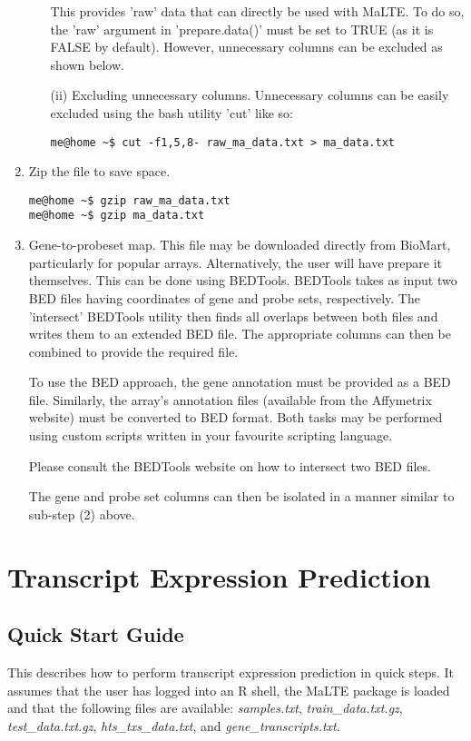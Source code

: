 \documentclass[a4paper,12pt]{article}
\begin{document}
\begin{enumerate}
\begin{enumerate}
This provides 'raw' data that can directly be used with MaLTE. To do so, the 'raw' argument in 'prepare.data()' must be set to TRUE (as it is FALSE by default). However, unnecessary columns can be excluded as shown below.

\item[(ii)] Excluding unnecessary columns. Unnecessary columns can be easily excluded using the bash utility 'cut' like so:

\begin{verbatim}
me@home ~$ cut -f1,5,8- raw_ma_data.txt > ma_data.txt
\end{verbatim}

\end{enumerate}

\item Zip the file to save space.
\begin{verbatim}
me@home ~$ gzip raw_ma_data.txt
me@home ~$ gzip ma_data.txt
\end{verbatim}

\item Gene-to-probeset map. This file may be downloaded directly from BioMart, particularly for popular arrays. Alternatively, the user will have prepare it themselves. This can be done using BEDTools. BEDTools takes as input two BED files having coordinates of gene and probe sets, respectively. The 'intersect' BEDTools utility then finds all overlaps between both files and writes them to an extended BED file. The appropriate columns can then be combined to provide the required file.

To use the BED approach, the gene annotation must be provided as a BED file. Similarly, the array's annotation files (available from the Affymetrix website) must be converted to BED format. Both tasks may be performed using custom scripts written in your favourite scripting language.

Please consult the BEDTools website on how to intersect two BED files.

The gene and probe set columns can then be isolated in a manner similar to sub-step (2) above.
\end{enumerate}


\section{Transcript Expression Prediction}
\label{tiep}

\subsection{Quick Start Guide}
\label{tiep:quick}
This describes how to perform transcript expression prediction in quick steps. It assumes that the user has logged into an R shell, the MaLTE package is loaded and that the following files are available: \textit{samples.txt}, \textit{train\_data.txt.gz}, \textit{test\_data.txt.gz}, \textit{hts\_txs\_data.txt}, and \textit{gene\_transcripts.txt}.
\end{document}
